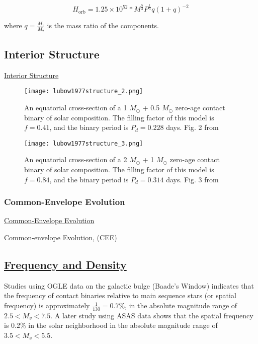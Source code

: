 \documentclass[12pt]{article} %
\numberwithin{equation}{section} %
\begin{document}
\begin{equation} \label{gazeas2008angular_7}
H_{\text{orb}} = 1.25 \times 10^{52} * M^{\frac{5}{3}} P^{\frac{1}{3}} q(1 + q)^{-2}
\end{equation}

where $q = \frac{M_{1}}{M_{2}}$ is the mass ratio of the components.


\citep{gazeas2006masses}

\subsection{Interior Structure}{\hyperlink{toc}{Interior Structure}} \label{sec: Interior Structure}

\begin{figure}[H]
\centering
\texttt{[image: lubow1977structure\_2.png]}
\caption{An equatorial cross-section of a 1 $M_{\odot}$ + 0.5 $M_{\odot}$ zero-age contact binary of solar composition. The filling factor of this model is $f = 0.41$, and the binary period is $P_{d} = 0.228$ days. Fig. 2 from \citet{lubow1977structure}}
\label{fig: lubow1977structure_2}
\end{figure}

\begin{figure}[H]
\centering
\texttt{[image: lubow1977structure\_3.png]}
\caption{An equatorial cross-section of a 2 $M_{\odot}$ + 1 $M_{\odot}$ zero-age contact binary of solar composition. The filling factor of this model is $f = 0.84$, and the binary period is $P_{d} = 0.314$ days. Fig. 3 from \citet{lubow1977structure}}
\label{fig: lubow1977structure_3}
\end{figure}

\subsubsection{Common-Envelope Evolution}{\hyperlink{toc}{Common-Envelope Evolution}} \label{sec: Common-Envelope Evolution}

Common-envelope Evolution, (CEE) \citep{ivanova2013common}

\subsection[Frequency and Density]{\hyperlink{toc}{Frequency and Density}}

 \citep{rucinski1998contact} Studies using OGLE data on the galactic bulge (Baade's Window) indicates that the frequency of contact binaries relative to main sequence stars (or spatial frequency) is approximately $\frac{1}{130} = 0.7\%$, in the absolute magnitude range of $2.5 < M_{v} < 7.5$. A later study using ASAS data shows that the spatial frequency is 0.2\% in the solar neighborhood \citep{rucinski2006luminosity} in the absolute magnitude range of $3.5 < M_{v} < 5.5$.
\end{document}
